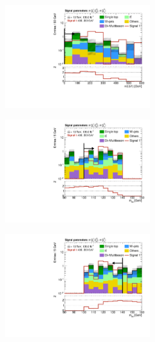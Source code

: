 \begin{figure}
\begin{subfigure}[b]{0.5\linewidth}
		\caption{}
	\end{subfigure}\hfill
	\begin{subfigure}[b]{0.5\linewidth}
		\centering\includegraphics[width=0.7\textwidth]{N-1_cut_scan/n1_400_200/mlb1}
		\caption{}
	\end{subfigure}\hfill
	\begin{subfigure}[b]{0.5\linewidth}
		\centering\includegraphics[width=0.7\textwidth]{N-1_cut_scan/n1_400_200/mbb_lower}
		\caption{}
	\end{subfigure}\hfill
	\begin{subfigure}[b]{0.5\linewidth}
		\centering\includegraphics[width=0.7\textwidth]{N-1_cut_scan/n1_400_200/mbb_upper}

\end{subfigure}
\end{figure}
